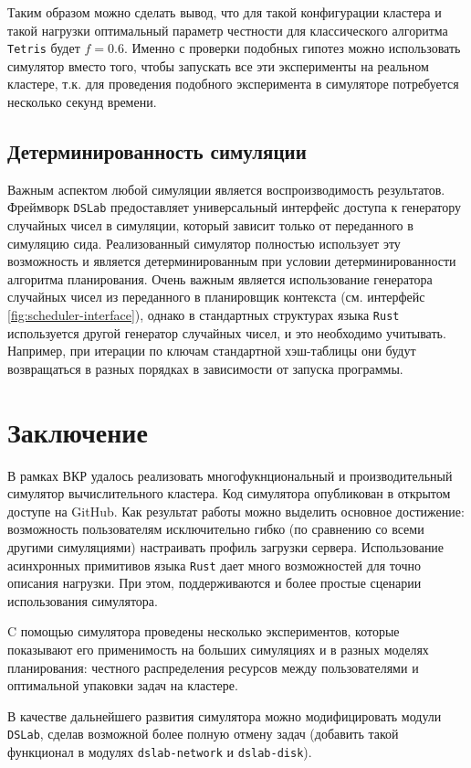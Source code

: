 Таким образом можно сделать вывод, что для такой конфигурации кластера и такой нагрузки оптимальный параметр честности для классического алгоритма \texttt{Tetris} будет $f = 0.6$. Именно с проверки подобных гипотез можно использовать симулятор вместо того, чтобы запускать все эти эксперименты на реальном кластере, т.к. для проведения подобного эксперимента в симуляторе потребуется несколько секунд времени. 

\subsection{Детерминированность симуляции}

Важным аспектом любой симуляции является воспроизводимость результатов. Фреймворк \texttt{DSLab} предоставляет универсальный интерфейс доступа к генератору случайных чисел в симуляции, который зависит только от переданного в симуляцию сида. Реализованный симулятор полностью использует эту возможность и является детерминированным при условии детерминированности алгоритма планирования. Очень важным является использование генератора случайных чисел из переданного в планировщик контекста (см. интерфейс \ref{fig:scheduler-interface}), однако в стандартных структурах языка \texttt{Rust} используется другой генератор случайных чисел, и это необходимо учитывать. Например, при итерации по ключам стандартной хэш-таблицы они будут возвращаться в разных порядках в зависимости от запуска программы. 

\section{Заключение}\label{sec:conclusion}

В рамках ВКР удалось реализовать многофукнциональный и производительный симулятор вычислительного кластера. Код симулятора опубликован в открытом доступе на GitHub\cite{dslab-cluster-scheduling-repo}. Как результат работы можно выделить основное достижение: возможность пользователям исключительно гибко (по сравнению со всеми другими симуляциями) настраивать профиль загрузки сервера. Использование асинхронных примитивов языка \texttt{Rust} дает много возможностей для точно описания нагрузки. При этом, поддерживаются и более простые сценарии использования симулятора. 

C помощью симулятора проведены несколько экспериментов, которые показывают его применимость на больших симуляциях и в разных моделях планирования: честного распределения ресурсов между пользователями и  оптимальной упаковки задач на кластере. 


В качестве дальнейшего развития симулятора можно модифицировать модули \texttt{DSLab}, сделав возможной более полную отмену задач (добавить такой функционал в модулях \texttt{dslab-network} и \texttt{dslab-disk}). 


